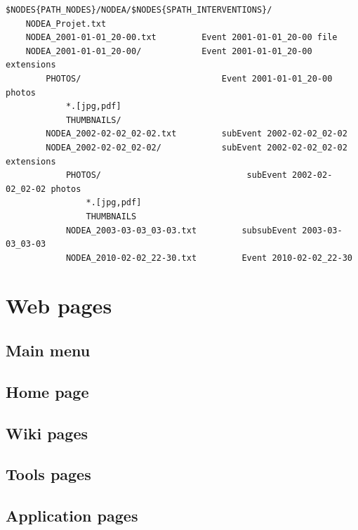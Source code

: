 \begin{lstlisting}[title=Unfolded example for node NODEA INTERVENTIONS]
$NODES{PATH_NODES}/NODEA/$NODES{SPATH_INTERVENTIONS}/
	NODEA_Projet.txt
	NODEA_2001-01-01_20-00.txt         Event 2001-01-01_20-00 file
	NODEA_2001-01-01_20-00/            Event 2001-01-01_20-00 extensions
		PHOTOS/                            Event 2001-01-01_20-00 photos 
			*.[jpg,pdf]                         
			THUMBNAILS/                         
		NODEA_2002-02-02_02-02.txt         subEvent 2002-02-02_02-02
		NODEA_2002-02-02_02-02/            subEvent 2002-02-02_02-02 extensions
			PHOTOS/                             subEvent 2002-02-02_02-02 photos
				*.[jpg,pdf]                         
				THUMBNAILS                          
			NODEA_2003-03-03_03-03.txt         subsubEvent 2003-03-03_03-03
			NODEA_2010-02-02_22-30.txt         Event 2010-02-02_22-30
\end{lstlisting}



\section{Web pages}



\subsection{Main menu}


\subsection{Home page}


\subsection{Wiki pages}


\subsection{Tools pages}


\subsection{Application pages}


